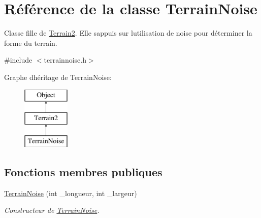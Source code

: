 \hypertarget{class_terrain_noise}{}\section{Référence de la classe Terrain\+Noise}
\label{class_terrain_noise}


Classe fille de \hyperlink{class_terrain2}{Terrain2}. Elle s\textquotesingle{}appuis sur l\textquotesingle{}utilisation de noise pour déterminer la forme du terrain.  




{\ttfamily \#include $<$terrainnoise.\+h$>$}

Graphe d\textquotesingle{}héritage de Terrain\+Noise\+:\begin{figure}[H]
\begin{center}
\leavevmode
\includegraphics[height=3.000000cm]{class_terrain_noise}
\end{center}
\end{figure}
\subsection*{Fonctions membres publiques}
\begin{DoxyCompactItemize}
\item 
\hyperlink{class_terrain_noise_ade7285caeec8d121790159ad6b0af25f}{Terrain\+Noise} (int \+\_\+longueur, int \+\_\+largeur)
\begin{DoxyCompactList}\small\item\em Constructeur de \hyperlink{class_terrain_noise}{Terrain\+Noise}. \end{DoxyCompactList}\end{DoxyCompactItemize}
